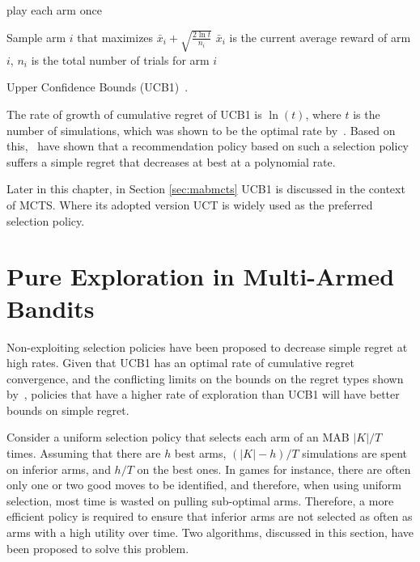\documentclass{kecsmstr}
\begin{document}
\IncMargin{1em}
\begin{algorithm2e}[ht]
	\Indm
	\vspace{0.2cm}
	\Indp

	play each arm once 																				\;

	 {
		Sample arm $i$ that maximizes $\bar{x}_i + \displaystyle\sqrt{\frac{2\ln{t}}{n_i}}$ \newline
		$\bar{x}_i$ is the current average reward of arm $i$, $n_i$ is the total number of trials for arm $i$ \;
	}

  \caption[Upper Confidence Bounds (UCB1)]{Upper Confidence Bounds (UCB1)~\protect{}. \label{alg:ucb}}
\end{algorithm2e}
\DecMargin{1em}

The rate of growth of cumulative regret of UCB1 is $\ln(t)$, where $t$ is the number of simulations, which was shown to be the optimal rate by~. Based on this,~ have shown that a recommendation policy based on such a selection policy suffers a simple regret that decreases at best at a polynomial rate. 

Later in this chapter, in Section \ref{sec:mabmcts} UCB1 is discussed in the context of MCTS. Where its adopted version UCT is widely used as the preferred selection policy.
\newpage
\section{Pure Exploration in Multi-Armed Bandits}
\label{sec:pureexplmab}
Non-exploiting selection policies have been proposed to decrease simple regret at high rates. Given that UCB1 has an optimal rate of cumulative regret convergence, and the conflicting limits on the bounds on the regret types shown by~, policies that have a higher rate of exploration than UCB1 will have better bounds on simple regret. 

Consider a uniform selection policy that selects each arm of an MAB $|K|/T$ times. Assuming that there are $h$ best arms, $(|K|-h)/T$ simulations are spent on inferior arms, and $h/T$ on the best ones. In games for instance, there are often only one or two good moves to be identified, and therefore, when using uniform selection, most time is wasted on pulling sub-optimal arms. Therefore, a more efficient policy is required to ensure that inferior arms are not selected as often as arms with a high utility over time. Two algorithms, discussed in this section, have been proposed to solve this problem.
\end{document}
